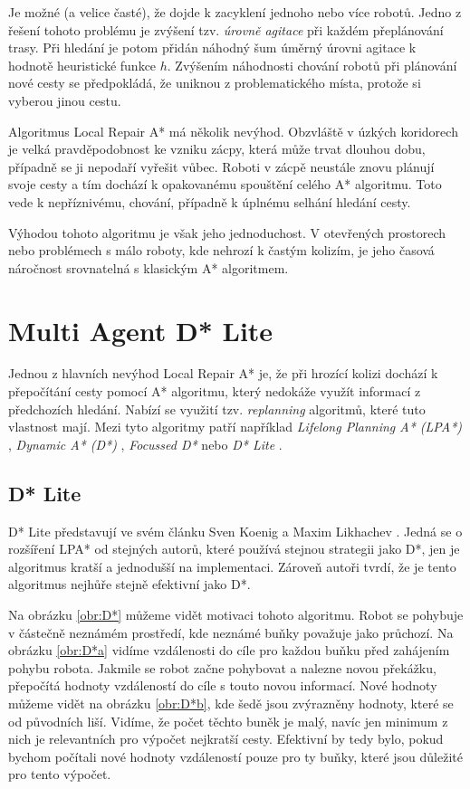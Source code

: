 
Je možné (a velice časté), že dojde k zacyklení jednoho nebo více robotů. Jedno z řešení tohoto problému je zvýšení tzv. \emph{úrovně agitace} při každém přeplánování trasy. Při hledání je potom přidán náhodný šum úměrný úrovni agitace k hodnotě heuristické funkce $h$. Zvýšením náhodnosti chování robotů při plánování nové cesty se předpokládá, že uniknou z problematického místa, protože si vyberou jinou cestu.

Algoritmus Local Repair A* má několik nevýhod. Obzvláště v úzkých koridorech je velká pravděpodobnost ke vzniku zácpy, která může trvat dlouhou dobu, případně se ji nepodaří vyřešit vůbec. Roboti v zácpě neustále znovu plánují svoje cesty a tím dochází k opakovanému spouštění celého A* algoritmu. Toto vede k nepříznivému,  chování, případně k úplnému selhání hledání cesty.

Výhodou tohoto algoritmu je však jeho jednoduchost. V otevřených prostorech nebo problémech s málo roboty, kde nehrozí k častým kolizím, je jeho časová náročnost srovnatelná s klasickým A* algoritmem.


\section{Multi Agent D* Lite}
Jednou z hlavních nevýhod Local Repair A* je, že při hrozící kolizi dochází k přepočítání cesty pomocí A* algoritmu, který nedokáže využít informací z předchozích hledání. Nabízí se využití tzv. \emph{replanning} algoritmů, které tuto vlastnost mají. Mezi tyto algoritmy patří například \emph{Lifelong Planning A* (LPA*)} \cite{Koenig2004}, \emph{Dynamic A* (D*)} \cite{Stentz1997}, \emph{Focussed D*} \cite{Stentz1995} nebo \emph{D* Lite} \cite{Koenig2002}.

\subsection{D* Lite}\label{sec:D*Lite}
D* Lite představují ve svém článku Sven Koenig a Maxim Likhachev \cite{Koenig2002}. Jedná se o rozšíření LPA* od stejných autorů, které používá stejnou strategii jako D*, jen je algoritmus kratší a jednodušší na implementaci. Zároveň autoři tvrdí, že je tento algoritmus nejhůře stejně efektivní jako D*.

Na obrázku \ref{obr:D*} můžeme vidět motivaci tohoto algoritmu. Robot se pohybuje v částečně neznámém prostředí, kde neznámé buňky považuje jako průchozí. Na obrázku \ref{obr:D*a} vidíme vzdálenosti do cíle pro každou buňku před zahájením pohybu robota. Jakmile se robot začne pohybovat a nalezne novou překážku, přepočítá hodnoty vzdáleností do cíle s touto novou informací. Nové hodnoty můžeme vidět na obrázku \ref{obr:D*b}, kde šedě jsou zvýrazněny hodnoty, které se od původních liší. Vidíme, že počet těchto buněk je malý, navíc jen minimum z nich je relevantních pro výpočet nejkratší cesty. Efektivní by tedy bylo, pokud bychom počítali nové hodnoty vzdáleností pouze pro ty buňky, které jsou důležité pro tento výpočet.

